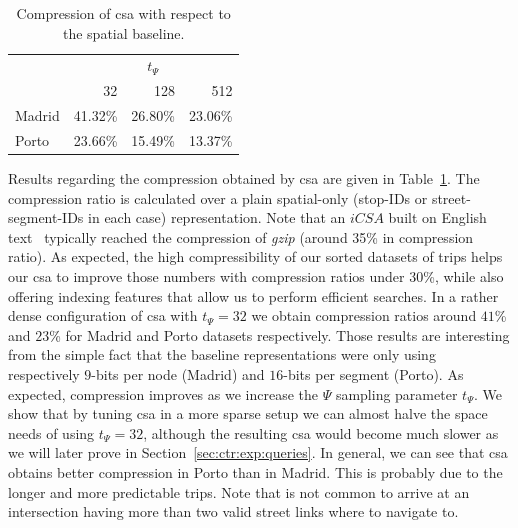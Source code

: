 	\begin{table}[ht]
	\begin{center}
	  \begin{tabular}{|l|*{3}{r}|}
	  \cline{2-4}
	  \multicolumn{1}{c|}{} & \multicolumn{3}{c|}{$t_{\Psi}$ } \\
	  \multicolumn{1}{c|}{} & 32 & 128 & 512 \\
	  \hline
	  Madrid & 41.32\% & 26.80\% & 23.06\% \\
	  Porto & 23.66\% & 15.49\% & 13.37\% \\
	  \hline
	  \end{tabular}
	  
	\caption{Compression of \acrshort{csa} with respect to the spatial baseline.}
	\label{table:ctr:exp:space:spat}
	\end{center}
	\end{table}

	Results regarding the compression obtained by \gls{csa} are given in Table~\ref{table:ctr:exp:space:spat}.
	The compression ratio is calculated over a plain spatial-only (stop-IDs or street-segment-IDs in each case) representation.
	Note that an $iCSA$  built on English text~\cite{FBNCPR12} typically
	reached the compression of {\em gzip} (around 35\% in compression ratio).
	As expected, the high compressibility of our sorted datasets of trips helps our \gls{csa} to improve those numbers with compression ratios under 30\%, while also offering indexing features
	that allow us to perform efficient searches.
	In a rather dense 
	configuration of \gls{csa} with $t_{\Psi}=32$ we obtain compression ratios around $41$\% and $23$\% for Madrid and Porto datasets respectively.
	Those results are interesting from the simple fact that the baseline representations were only using respectively 
	$9$-bits per node (Madrid) and $16$-bits per segment (Porto). 
	As expected, compression improves as we increase the $\Psi$ sampling parameter $t_{\Psi}$. We show that by tuning 
	\gls{csa} in a more sparse setup we can almost halve the space needs of using $t_{\Psi}=32$, although the resulting \gls{csa} would become
	much slower as we will later prove in Section~\ref{sec:ctr:exp:queries}.
	In general, we can see that \gls{csa} obtains better compression in Porto than in Madrid. This is probably due to the longer and
	more predictable trips. Note that is not common to arrive at an intersection having more than two valid street links where to navigate to.

